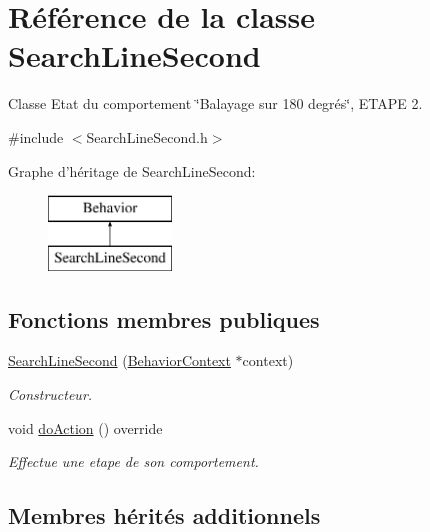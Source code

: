\hypertarget{class_search_line_second}{\section{Référence de la classe Search\-Line\-Second}
\label{class_search_line_second}
}


Classe Etat du comportement \char`\"{}\-Balayage sur 180 degrés\char`\"{}, E\-T\-A\-P\-E 2.  




{\ttfamily \#include $<$Search\-Line\-Second.\-h$>$}

Graphe d'héritage de Search\-Line\-Second\-:\begin{figure}[H]
\begin{center}
\leavevmode
\includegraphics[height=2.000000cm]{class_search_line_second}
\end{center}
\end{figure}
\subsection*{Fonctions membres publiques}
{\bf }\par
\begin{DoxyCompactItemize}
\item 
\hyperlink{class_search_line_second_adeea2bb88b54f2911ad061168aaa3732}{Search\-Line\-Second} (\hyperlink{class_behavior_context}{Behavior\-Context} $\ast$context)
\begin{DoxyCompactList}\small\item\em Constructeur. \end{DoxyCompactList}\item 
void \hyperlink{class_search_line_second_aa8c22973fcbef2b0acaf27d129a40172}{do\-Action} () override
\begin{DoxyCompactList}\small\item\em Effectue une etape de son comportement. \end{DoxyCompactList}\end{DoxyCompactItemize}

\subsection*{Membres hérités additionnels}


